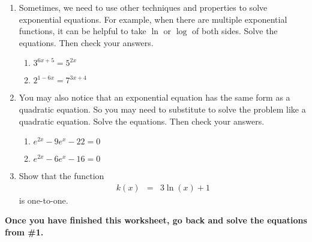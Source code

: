 \begin{enumerate}
\clearpage

\item Sometimes, we need to use other techniques and properties to
  solve exponential equations.  For example, when there are multiple
  exponential functions, it can be helpful to take $\ln$ or $\log$ of
  both sides.  Solve the equations.  Then check your answers.
\begin{enumerate}
\item $3^{6x+5}=5^{2x}$
\vfill

\item $2^{1-6x}=7^{3x+4}$
\vfill

\end{enumerate}
\clearpage

\item You may also notice that an exponential equation has the same
  form as a quadratic equation.  So you may need to substitute to
  solve the problem like a quadratic equation.  Solve the equations.
  Then check your answers.
\begin{enumerate}
\item $e^{2x}-9e^x-22=0$\vfill
\item $e^{2x}-6e^x-16=0$\vfill
\end{enumerate}

\item Show that the function
  \begin{eqnarray*}
    k(x) & = & 3 \ln(x) + 1
  \end{eqnarray*}
  is one-to-one.
  \vfill

\end{enumerate}

\noindent \textbf{Once you have finished this worksheet, go back and
  solve the equations from \#1.}



